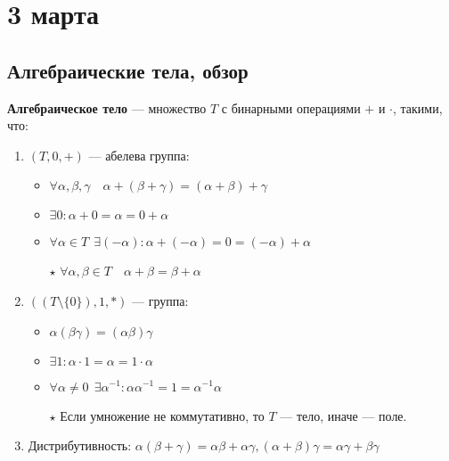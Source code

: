 \chapter{3 марта}

\section{Алгебраические тела, обзор}

\begin{definition}
    \textbf{Алгебраическое тело} --- множество \(T\) с бинарными операциями \(+\) и \(\cdot\), такими, что:
    \begin{enumerate}
        \item \((T, 0, +)\) --- абелева группа:
              \begin{itemize}
                  \item \(\forall \alpha, \beta, \gamma \quad \alpha + (\beta + \gamma) = (\alpha + \beta) + \gamma\)
                  \item \(\exists 0 : \alpha + 0 = \alpha = 0 + \alpha\)
                  \item \(\forall \alpha \in T \ \ \exists ( - \alpha) : \alpha + ( - \alpha) = 0 = ( - \alpha) + \alpha\)
                  \item[\(\star\)] \(\forall \alpha, \beta \in T \quad \alpha + \beta = \beta + \alpha\)
              \end{itemize}
        \item \(((T \setminus \{0\}), 1, *)\) --- группа:
              \begin{itemize}
                  \item \(\alpha (\beta \gamma) = (\alpha \beta) \gamma\)
                  \item \(\exists 1 : \alpha \cdot 1 = \alpha = 1 \cdot \alpha\)
                  \item \(\forall \alpha \neq 0 \ \ \exists \alpha^{-1} : \alpha\alpha^{-1} = 1 = \alpha^{-1}\alpha\)
                  \item[\(\star\)] Если умножение не коммутативно, то \(T\) --- тело, иначе --- поле.
              \end{itemize}
        \item Дистрибутивность: \(\alpha(\beta + \gamma) = \alpha\beta + \alpha\gamma, (\alpha + \beta)\gamma = \alpha \gamma + \beta\gamma\)
    \end{enumerate}
\end{definition}


